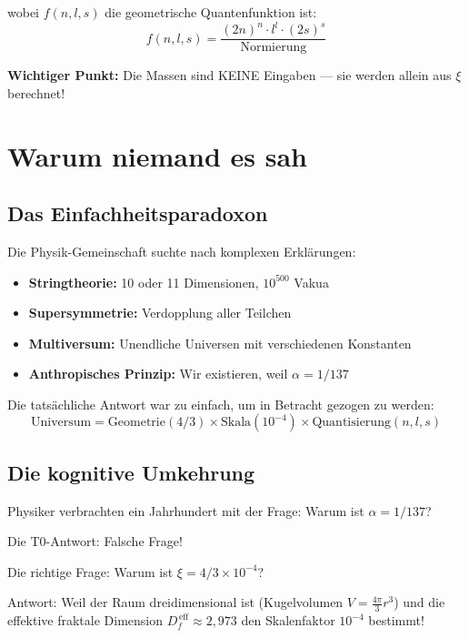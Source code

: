 	wobei $f(n,l,s)$ die geometrische Quantenfunktion ist:
	\begin{equation}
		f(n,l,s) = \frac{(2n)^n \cdot l^l \cdot (2s)^s}{\text{Normierung}}
	\end{equation}
	
	\textbf{Wichtiger Punkt:} Die Massen sind KEINE Eingaben — sie werden allein aus $\xi$ berechnet!
	
	\section{Warum niemand es sah}
	
	\subsection{Das Einfachheitsparadoxon}
	
	Die Physik-Gemeinschaft suchte nach komplexen Erklärungen:
	
	\begin{itemize}
		\item \textbf{Stringtheorie:} 10 oder 11 Dimensionen, $10^{500}$ Vakua
		\item \textbf{Supersymmetrie:} Verdopplung aller Teilchen
		\item \textbf{Multiversum:} Unendliche Universen mit verschiedenen Konstanten
		\item \textbf{Anthropisches Prinzip:} Wir existieren, weil $\alpha = 1/137$
	\end{itemize}
	
	Die tatsächliche Antwort war zu einfach, um in Betracht gezogen zu werden:
	\begin{equation}
		\boxed{\text{Universum} = \text{Geometrie}(4/3) \times \text{Skala}(10^{-4}) \times \text{Quantisierung}(n,l,s)}
	\end{equation}
	
	\subsection{Die kognitive Umkehrung}
	
	\begin{tcolorbox}[colback=purple!5!white,colframe=purple!75!black,title=Entdeckung]
		Physiker verbrachten ein Jahrhundert mit der Frage: Warum ist $\alpha = 1/137$?
		
		Die T0-Antwort: Falsche Frage!
		
		Die richtige Frage: Warum ist $\xi = 4/3 \times 10^{-4}$?
		
		Antwort: Weil der Raum dreidimensional ist (Kugelvolumen $V = \frac{4\pi}{3} r^3$) und die effektive fraktale Dimension $D_f^{\,\text{eff}} \approx 2{,}973$ den Skalenfaktor $10^{-4}$ bestimmt!
	\end{tcolorbox}
	
